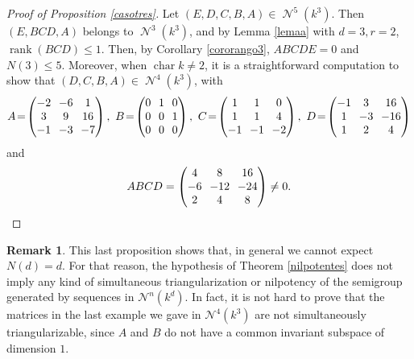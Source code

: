 \documentclass[JEP,XML,SOM,Unicode,NoEqCountersInSection]{cedram}
\let\mathcal\mathscr
\theoremstyle{plain}
\theoremstyle{definition}
\newtheorem{obs}[teo]{Remark}
\DeclareMathOperator{\Char}{char}
\DeclareMathOperator{\Nil}{\mathcal{N}}
\DeclareMathOperator{\rank}{rank}
\begin{document}
\begin{proof}[Proof of Proposition \ref{casotres}]
Let $(E,D,C,B,A)\in \Nil^{5}(k^{3})$. Then $(E,BCD,A)$ belongs to $\Nil^{3}(k^{3})$, and by Lemma \ref{lemaa} with $d=3, r=2$, $\rank(BCD)\leq 1$. Then, by Corollary \ref{cororango3}, $ABCDE=0$ and $N(3)\leq 5$.
Moreover, when $\Char{k}\neq 2$, it is a straightforward computation to show that $(D,C,B,A)\in \Nil^{4}(k^{3})$, with
\begin{equation*}
\arraycolsep3.5pt
A\!=\!\begin{pmatrix}
-2 & -6 & 1\\
3 & 9 & 16\\
-1 & -3 & -7\\
\end{pmatrix},\ B\!=\!\begin{pmatrix}
0 & 1 & 0\\
0 & 0 & 1\\
0 & 0 & 0\\
\end{pmatrix},\ C\!=\!\begin{pmatrix}
1 & 1 & 0\\
1 & 1 & 4\\
-1 & -1 & -2\\
\end{pmatrix},\ D\!=\!\begin{pmatrix}
-1 & 3 & 16\\
1 & -3 & -16\\
1 & 2 & 4\\
\end{pmatrix}
\end{equation*}
and
\[\arraycolsep3.5pt
ABCD=\begin{pmatrix}
4 & 8 & 16\\
-6 & -12 & -24\\
2 & 4 & 8\\
\end{pmatrix}\neq 0.\qedhere
\]
\end{proof}

\begin{obs} This last proposition shows that, in general we cannot expect \hbox{$N(d)=d$}. For that reason, the hypothesis of Theorem \ref{nilpotentes} does not imply any kind of simultaneous triangularization or nilpotency of the semigroup generated by sequences in $\mathcal{N}^{n}(k^{d})$. In fact, it is not hard to prove that the matrices in the last example we gave in $\mathcal{N}^{4}(k^{3})$ are not simultaneously triangularizable, since $A$ and $B$ do not have a common invariant subspace of dimension $1$.
\end{obs}
\end{document}
